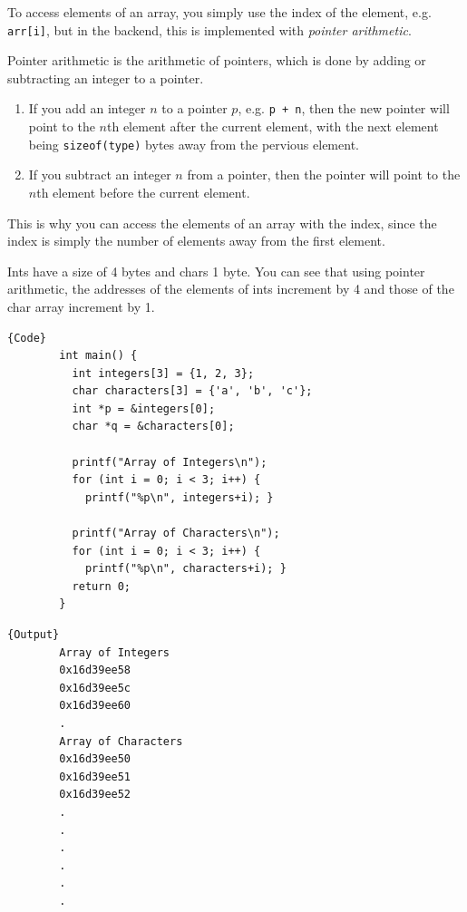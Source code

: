 \documentclass{article}
\begin{document}
    To access elements of an array, you simply use the index of the element, e.g. \texttt{arr[i]}, but in the backend, this is implemented with \textit{pointer arithmetic}. 

    \begin{definition}
      Pointer arithmetic is the arithmetic of pointers, which is done by adding or subtracting an integer to a pointer. 
      \begin{enumerate}
        \item If you add an integer $n$ to a pointer $p$, e.g. \texttt{p + n}, then the new pointer will point to the $n$th element after the current element, with the next element being \texttt{sizeof(type)} bytes away from the pervious element. 
        \item If you subtract an integer $n$ from a pointer, then the pointer will point to the $n$th element before the current element. 
      \end{enumerate}
      This is why you can access the elements of an array with the index, since the index is simply the number of elements away from the first element.
    \end{definition}

    \begin{example}
      Ints have a size of 4 bytes and chars 1 byte. You can see that using pointer arithmetic, the addresses of the elements of ints increment by 4 and those of the char array increment by 1. 
      \noindent\begin{minipage}{.5\textwidth}
      \begin{lstlisting}[]{Code}
        int main() { 
          int integers[3] = {1, 2, 3}; 
          char characters[3] = {'a', 'b', 'c'};
          int *p = &integers[0]; 
          char *q = &characters[0];
          
          printf("Array of Integers\n"); 
          for (int i = 0; i < 3; i++) { 
            printf("%p\n", integers+i); }

          printf("Array of Characters\n"); 
          for (int i = 0; i < 3; i++) { 
            printf("%p\n", characters+i); }
          return 0; 
        }
      \end{lstlisting}
      \end{minipage}
      \hfill
      \begin{minipage}{.49\textwidth}
      \begin{lstlisting}[]{Output}
        Array of Integers
        0x16d39ee58
        0x16d39ee5c
        0x16d39ee60
        .
        Array of Characters
        0x16d39ee50
        0x16d39ee51
        0x16d39ee52
        .
        .
        .
        .
        .
        .
      \end{lstlisting}
      \end{minipage}
    \end{example}
\end{document}
